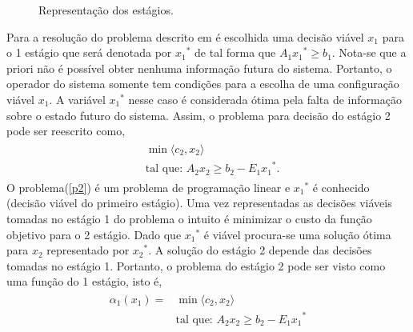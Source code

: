 \begin{figure}[!h]
 \centering
 \label{estagio}
\caption{Representa\c c\~ao dos est\'agios.}
\end{figure}


Para a  resolu\c c\~ao  do problema descrito em  \'e
escolhida uma decis\~ao vi\'avel $x_1$ para o 1 est\'agio que ser\'a denotada por ${x_1}^{*}$ de tal forma que $A_1{x_1}^{*} \geq b_1$.
Nota-se que a priori n\~ao \'e poss\'ivel obter nenhuma informa\c c\~ao futura do sistema. Portanto, o operador do sistema
somente tem condi\c c\~oes para a escolha de uma configura\c c\~ao vi\'avel $x_1$. A vari\'avel ${x_1}^{*}$ nesse
caso \'e considerada \'otima pela falta de informa\c c\~ao sobre o estado futuro do sistema.
Assim, o problema para decis\~ao do est\'agio 2 pode ser reescrito como, 
\begin{align}
  \begin{split}	
 & 	\min \langle c_2,x_2\rangle  \\
&\mbox{tal que: }A_2 x_2 \geq b_2 -{E_1 x_1}^{*}.
  \end{split}
    \label{p2}
\end{align}
O problema(\ref {p2}) \'e um problema de programa\c c\~ao linear e ${x_1}^{*}$ \'e conhecido (decis\~ao vi\'avel do
primeiro est\'agio). Uma vez representadas
as decis\~oes vi\'aveis tomadas no est\'agio 1 do
problema o intuito \'e minimizar o custo da fun\c c\~ao objetivo para o 2 est\'agio. Dado que ${x_1}^{*}$ \'e vi\'avel procura-se uma solu\c c\~ao \'otima para $x_2$ representado por
${x_2}^{*}$. A solu\c c\~ao do est\'agio 2 depende das decis\~oes tomadas no est\'agio 1. Portanto, o
problema do est\'agio 2 pode ser visto como uma fun\c c\~ao do 1 est\'agio, isto \'e,
\begin{align}
  \begin{split}	
	\alpha_{1} (x_1) =& \min \langle c_2,x_2\rangle \\
	&\mbox{tal que: }A_2 x_2 \geq b_2 - {E_1 x_1}^{*} 
  \end{split}
    \label{p3}
\end{align}
